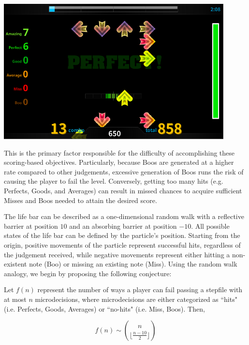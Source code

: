 \begin{center}
\includegraphics[width=12cm]{reports/figures/images/gameplay.png}
\label{fig:gameplay}
\end{center}

This is the primary factor responsible for the difficulty of accomplishing these scoring-based objectives. Particularly, because Boos are generated at a higher rate compared to other judgements, excessive generation of Boos runs the risk of causing the player to fail the level. Conversely, getting too many hits (e.g. Perfects, Goods, and Averages) can result in missed chances to acquire sufficient Misses and Boos needed to attain the desired score.

\vspace{2mm}

The life bar can be described as a one-dimensional random walk with a reflective barrier at position $10$ and an absorbing barrier at position $-10$. All possible states of the life bar can be defined by the particle's position. Starting from the origin, positive movements of the particle represent successful hits, regardless of the judgement received, while negative movements represent either hitting a non-existent note (Boo) or missing an existing note (Miss). Using the random walk analogy, we begin by proposing the following conjecture:

\begin{conjecture}
Let $f(n)$ represent the number of ways a player can fail passing a stepfile with at most $n$ microdecisions, where microdecisions are either categorized as ``hits" (i.e. Perfects, Goods, Averages) or ``no-hits" (i.e. Miss, Boos). Then,

$$f(n) \sim \binom{n}{\lfloor\frac{n-10}{2}\rfloor}$$
\end{conjecture}

